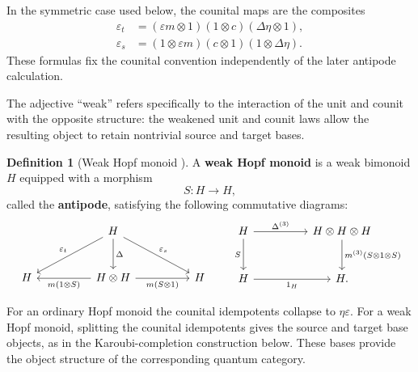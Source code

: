 \documentclass[oneside]{article}
\theoremstyle{plain}
\theoremstyle{definition}
\newtheorem{definition}[theorem]{Definition}
\theoremstyle{remark}
\begin{document}
In the symmetric case used below, the counital maps are the composites
\begin{align}
 \varepsilon_t&=(\varepsilon m\otimes1)(1\otimes c)(\Delta\eta\otimes1),
 \label{eq:cgqg-canonical-target-composite}\\
 \varepsilon_s&=(1\otimes\varepsilon m)(c\otimes1)(1\otimes\Delta\eta).
 \label{eq:cgqg-canonical-source-composite}
\end{align}
These formulas fix the counital convention independently of the later
antipode calculation.

The adjective ``weak'' refers specifically to the interaction of the unit and counit with the opposite structure: the weakened unit and counit laws allow the resulting object to retain nontrivial source and target bases.

\begin{definition}[Weak Hopf monoid {\cite[Def.~2.1]{PastroStreet2009}}]
\label{def:cgqg-background-weak-hopf-monoid}
    A \textbf{weak Hopf monoid} is a weak bimonoid \(H\) equipped with a morphism
    \[
        S:H\longrightarrow H,
    \]
    called the \textbf{antipode}, satisfying the following commutative diagrams:
    \begin{equation}
        \begin{tikzcd}[column sep=huge,row sep=large]
            & H
                \arrow[d,"\Delta"]
                \arrow[dl,"\varepsilon_t"']
                \arrow[dr,"\varepsilon_s"]
            & \\
            H
            &
            H\otimes H
                \arrow[l,"m(1\otimes S)"]
                \arrow[r,"m(S\otimes1)"']
            &
            H
        \end{tikzcd}
        \qquad
        \begin{tikzcd}[column sep=huge,row sep=large]
            H
                \arrow[r,"\Delta^{(3)}"]
                \arrow[d,"S"']
            &
            H\otimes H\otimes H
                \arrow[d,"m^{(3)}(S\otimes1\otimes S)"]
            \\
            H
                \arrow[r,"1_H"']
            &
            H .
        \end{tikzcd}
        \label{eq:cgqg-background-antipode}
    \end{equation}
\end{definition}

For an ordinary Hopf monoid the counital idempotents collapse to
\(\eta\varepsilon\). For a weak Hopf monoid, splitting the counital idempotents gives the
source and target base objects, as in the Karoubi-completion construction
below. These bases provide the object structure of the corresponding
quantum category.
\end{document}

